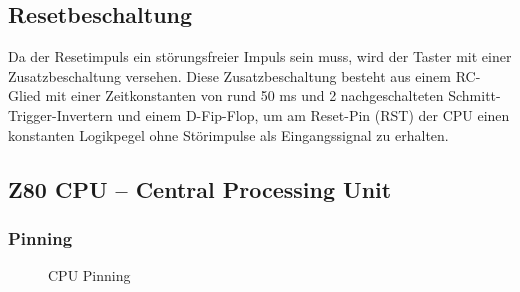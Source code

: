\subsection{Resetbeschaltung}
Da der Resetimpuls ein störungsfreier Impuls sein muss, wird der Taster mit einer Zusatzbeschaltung versehen. Diese Zusatzbeschaltung besteht aus einem RC-Glied mit einer Zeitkonstanten von rund 50 ms und 2 nachgeschalteten Schmitt-Trigger-Invertern und einem D-Fip-Flop, um am Reset-Pin (RST) der CPU einen konstanten Logikpegel ohne Störimpulse als Eingangssignal zu erhalten.

\subsection{Z80 CPU -- Central Processing Unit}
\subsubsection{Pinning}
\begin{figure}[htb]
    \qquad
    \qquad
    \caption[Z80 CPU Pinning]{CPU Pinning}
    \label{fig:z80-cpu-pinning}
\end{figure}

